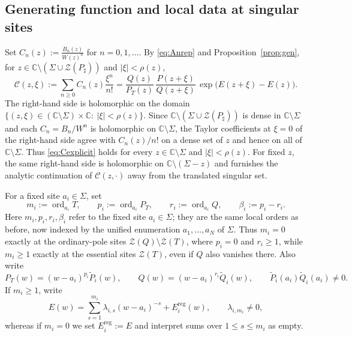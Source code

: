 \documentclass[reqno]{article}
\theoremstyle{definition}
\theoremstyle{remark}
\theoremstyle{plain}
\newcommand{\C}{\mathbb C}
\newcommand{\Z}{\mathcal Z}
\newcommand{\ord}{\operatorname{ord}}
\begin{document}
\subsection{Generating function and local data at singular sites}
Set $C_n(z):=\frac{B_n(z)}{W(z)^n}$ for $n=0,1,\dots$. 
By \eqref{eq:Anrep} and Proposition~\ref{prop:gen}, for $z\in\C\setminus(\Sigma\cup \Z(P_\sharp))$ and $|\xi|<\rho(z)$,
\begin{equation}\label{eq:Cexplicit}
\mathcal C(z,\xi):=\sum_{n\ge0}C_n(z)\frac{\xi^n}{n!}
=\frac{Q(z)}{P_T(z)}\,\frac{P(z+\xi)}{Q(z+\xi)}\,\exp\!\bigl(E(z+\xi)-E(z)\bigr).
\end{equation}
The right-hand side is holomorphic on the domain $\{(z,\xi)\in(\C\setminus\Sigma)\times\C:\ |\xi|<\rho(z)\}$. Since $\C\setminus(\Sigma\cup\Z(P_\sharp))$ is dense in $\C\setminus\Sigma$ and each $C_n=B_n/W^n$ is holomorphic on $\C\setminus\Sigma$, the Taylor coefficients at $\xi=0$ of the right-hand side agree with $C_n(z)/n!$ on a dense set of $z$ and hence on all of $\C\setminus\Sigma$. Thus \eqref{eq:Cexplicit} holds for every $z\in\C\setminus\Sigma$ and $|\xi|<\rho(z)$. For fixed $z$, the same right-hand side is holomorphic on $\C\setminus(\Sigma-z)$ and furnishes the analytic continuation of $\mathcal C(z,\cdot)$ away from the translated singular set.

\medskip
For a fixed site $a_i\in\Sigma$, set
\begin{equation}\label{eq:local-orders-unified}
m_i:=\ord_{a_i}T,\qquad p_i:=\ord_{a_i}P_T,\qquad r_i:=\ord_{a_i}Q,\qquad \beta_i:=p_i-r_i.
\end{equation}
Here $m_i,p_i,r_i,\beta_i$ refer to the fixed site $a_i\in\Sigma$; they are the same local orders as before, now indexed by the unified enumeration $a_1,\dots,a_N$ of $\Sigma$. Thus $m_i=0$ exactly at the ordinary-pole sites $\Z(Q)\setminus\Z(T)$, where $p_i=0$ and $r_i\ge1$, while $m_i\ge1$ exactly at the essential sites $\Z(T)$, even if $Q$ also vanishes there. Also write
\begin{equation}\label{eq:local-factors-unified}
P_T(w)=(w-a_i)^{p_i}\widetilde P_i(w),\qquad
Q(w)=(w-a_i)^{r_i}\widetilde Q_i(w),\qquad
\widetilde P_i(a_i)\widetilde Q_i(a_i)\ne0.
\end{equation}
If $m_i\ge1$, write
\begin{equation}\label{eq:E-local-unified}
E(w)=\sum_{s=1}^{m_i}\lambda_{i,s}(w-a_i)^{-s}+E_i^{\mathrm{reg}}(w),\qquad \lambda_{i,m_i}\ne0,
\end{equation}
whereas if $m_i=0$ we set $E_i^{\mathrm{reg}}:=E$ and interpret sums over $1\le s\le m_i$ as empty.
\end{document}
